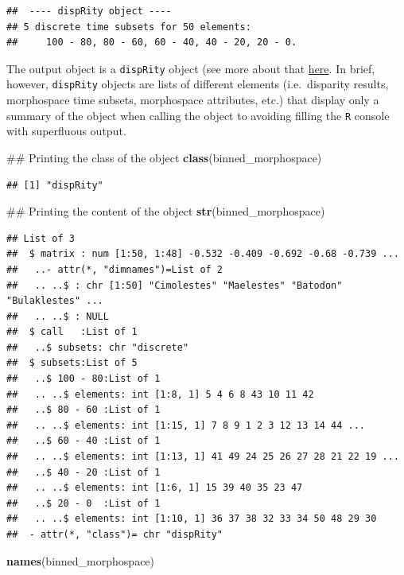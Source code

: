 \documentclass[]{book}
\newenvironment{Shaded}{\begin{snugshade}}{\end{snugshade}}
\newcommand{\KeywordTok}[1]{\textcolor[rgb]{0.13,0.29,0.53}{\textbf{#1}}}
\newcommand{\NormalTok}[1]{#1}
\theoremstyle{definition}
\theoremstyle{definition}
\theoremstyle{remark}
\begin{document}
\begin{verbatim}
##  ---- dispRity object ---- 
## 5 discrete time subsets for 50 elements:
##     100 - 80, 80 - 60, 60 - 40, 40 - 20, 20 - 0.
\end{verbatim}

The output object is a \texttt{dispRity} object (see more about that
\protect\hyperlink{The-guts-of-the-dispRity-package}{here}. In brief,
however, \texttt{dispRity} objects are lists of different elements
(i.e.~disparity results, morphospace time subsets, morphospace
attributes, etc.) that display only a summary of the object when calling
the object to avoiding filling the \texttt{R} console with superfluous
output.

\begin{Shaded}
\begin{Highlighting}[]
\NormalTok{## Printing the class of the object}
\KeywordTok{class}\NormalTok{(binned_morphospace)}
\end{Highlighting}
\end{Shaded}

\begin{verbatim}
## [1] "dispRity"
\end{verbatim}

\begin{Shaded}
\begin{Highlighting}[]
\NormalTok{## Printing the content of the object}
\KeywordTok{str}\NormalTok{(binned_morphospace)}
\end{Highlighting}
\end{Shaded}

\begin{verbatim}
## List of 3
##  $ matrix : num [1:50, 1:48] -0.532 -0.409 -0.692 -0.68 -0.739 ...
##   ..- attr(*, "dimnames")=List of 2
##   .. ..$ : chr [1:50] "Cimolestes" "Maelestes" "Batodon" "Bulaklestes" ...
##   .. ..$ : NULL
##  $ call   :List of 1
##   ..$ subsets: chr "discrete"
##  $ subsets:List of 5
##   ..$ 100 - 80:List of 1
##   .. ..$ elements: int [1:8, 1] 5 4 6 8 43 10 11 42
##   ..$ 80 - 60 :List of 1
##   .. ..$ elements: int [1:15, 1] 7 8 9 1 2 3 12 13 14 44 ...
##   ..$ 60 - 40 :List of 1
##   .. ..$ elements: int [1:13, 1] 41 49 24 25 26 27 28 21 22 19 ...
##   ..$ 40 - 20 :List of 1
##   .. ..$ elements: int [1:6, 1] 15 39 40 35 23 47
##   ..$ 20 - 0  :List of 1
##   .. ..$ elements: int [1:10, 1] 36 37 38 32 33 34 50 48 29 30
##  - attr(*, "class")= chr "dispRity"
\end{verbatim}

\begin{Shaded}
\begin{Highlighting}[]
\KeywordTok{names}\NormalTok{(binned_morphospace)}
\end{Highlighting}
\end{Shaded}
\end{document}
